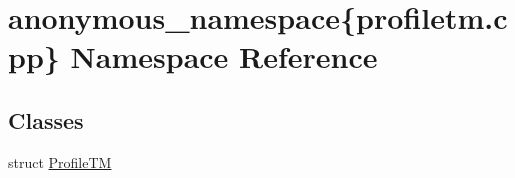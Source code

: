 \hypertarget{namespaceanonymous__namespace_02profiletm_8cpp_03}{\section{anonymous\-\_\-namespace\{profiletm.\-cpp\} Namespace Reference}
\label{namespaceanonymous__namespace_02profiletm_8cpp_03}
}
\subsection*{Classes}
\begin{DoxyCompactItemize}
\item 
struct \hyperlink{structanonymous__namespace_02profiletm_8cpp_03_1_1ProfileTM}{Profile\-T\-M}
\end{DoxyCompactItemize}
